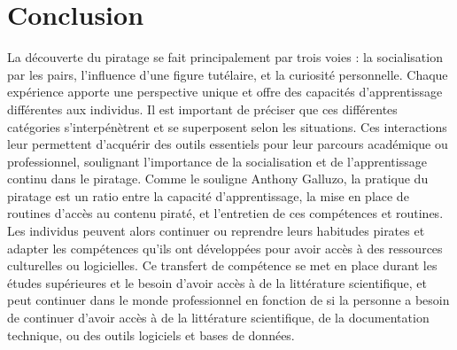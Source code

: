\section{Conclusion}

La découverte du piratage se fait principalement par trois voies : la socialisation par les pairs, l'influence d'une figure tutélaire, et la curiosité personnelle. Chaque expérience apporte une perspective unique et offre des capacités d'apprentissage différentes aux individus. Il est important de préciser que ces différentes catégories s’interpénètrent et se superposent selon les situations. Ces interactions leur permettent d'acquérir des outils essentiels pour leur parcours académique ou professionnel, soulignant l'importance de la socialisation et de l'apprentissage continu dans le piratage. Comme le souligne Anthony Galluzo, la pratique du piratage est un ratio entre la capacité d'apprentissage, la mise en place de routines d'accès au contenu piraté, et l'entretien de ces compétences et routines. Les individus peuvent alors continuer ou reprendre leurs habitudes pirates et adapter les compétences qu’ils ont développées pour avoir accès à des ressources culturelles ou logicielles. Ce transfert de compétence se met en place durant les études supérieures et le besoin d’avoir accès à de la littérature scientifique, et peut continuer dans le monde professionnel en fonction de si la personne a besoin de continuer d’avoir accès à de la littérature scientifique, de la documentation technique, ou des outils logiciels et bases de données.

 
